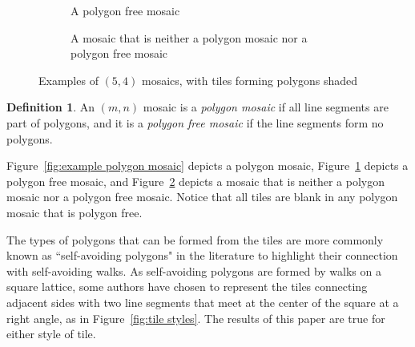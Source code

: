 \documentclass[12pt]{article}
\theoremstyle{plain}
\theoremstyle{remark}
\theoremstyle{definition}
\newtheorem{definition}{Definition}[section]
\theoremstyle{remark}
\theoremstyle{definition}
\newcommand{\cell}[4]{ \draw[thick] ( #1 , #2 ) rectangle ( #3 , #4 );}
\newcommand{\cellA}[4]{ \draw[thick] ( #1 , #2 ) rectangle ( #3 , #4 ); \draw[red, thick, densely dotted] (#3 * 0.5 + #1 * 0.5 , #2) -- (#1, #4 * 0.5 + #2 * 0.5);}
\newcommand{\cellC}[4]{ \draw[thick] ( #1 , #2 ) rectangle ( #3 , #4 ); \draw[red, thick, densely dotted] (#3 * 0.5 + #1 * 0.5 , #4) -- (#3, #4 * 0.5 + #2 * 0.5);}
\newcommand{\cellD}[4]{ \draw[thick] ( #1 , #2 ) rectangle ( #3 , #4 ); \draw[red, thick, densely dotted] (#3 * 0.5 + #1 * 0.5 , #4) -- (#1, #4 * 0.5 + #2 * 0.5);}
\newcommand{\cellE}[4]{ \draw[thick] ( #1 , #2 ) rectangle ( #3 , #4 ); \draw[red, thick, densely dotted] (#3, #4 * 0.5 + #2 * 0.5) -- (#1, #4 * 0.5 + #2 * 0.5);}
\newcommand{\cellF}[4]{ \draw[thick] ( #1 , #2 ) rectangle ( #3 , #4 ); \draw[red, thick, densely dotted] (#3 * 0.5 + #1 * 0.5 , #2) -- (#3 * 0.5 + #1 * 0.5 , #4);}
\newcommand{\cellAf}[4]{\filldraw[gray!80] ( #1 , #2 ) rectangle ( #3 , #4 ); \draw[thick] ( #1 , #2 ) rectangle ( #3 , #4 ); \draw[red, thick, densely dotted] (#3 * 0.5 + #1 * 0.5 , #2) -- (#1, #4 * 0.5 + #2 * 0.5);}
\newcommand{\cellBf}[4]{\filldraw[gray!80] ( #1 , #2 ) rectangle ( #3 , #4 ); \draw[thick] ( #1 , #2 ) rectangle ( #3 , #4 ); \draw[red, thick, densely dotted] (#3 * 0.5 + #1 * 0.5 , #2) -- (#3, #4 * 0.5 + #2 * 0.5);}
\newcommand{\cellCf}[4]{\filldraw[gray!80] ( #1 , #2 ) rectangle ( #3 , #4 ); \draw[thick] ( #1 , #2 ) rectangle ( #3 , #4 ); \draw[red, thick, densely dotted] (#3 * 0.5 + #1 * 0.5 , #4) -- (#3, #4 * 0.5 + #2 * 0.5);}
\newcommand{\cellDf}[4]{\filldraw[gray!80] ( #1 , #2 ) rectangle ( #3 , #4 ); \draw[thick] ( #1 , #2 ) rectangle ( #3 , #4 ); \draw[red, thick, densely dotted] (#3 * 0.5 + #1 * 0.5 , #4) -- (#1, #4 * 0.5 + #2 * 0.5);}
\newcommand{\cellEf}[4]{\filldraw[gray!80] ( #1 , #2 ) rectangle ( #3 , #4 ); \draw[thick] ( #1 , #2 ) rectangle ( #3 , #4 ); \draw[red, thick, densely dotted] (#3, #4 * 0.5 + #2 * 0.5) -- (#1, #4 * 0.5 + #2 * 0.5);}
\newcommand{\cellFf}[4]{\filldraw[gray!80] ( #1 , #2 ) rectangle ( #3 , #4 ); \draw[thick] ( #1 , #2 ) rectangle ( #3 , #4 ); \draw[red, thick, densely dotted] (#3 * 0.5 + #1 * 0.5 , #2) -- (#3 * 0.5 + #1 * 0.5 , #4);}
\begin{document}
\begin{figure}[h!]
\begin{center}
\begin{subfigure}[t]{0.29\textwidth}
\begin{center}
\begin{tikzpicture}
    \end{tikzpicture}
    \end{center}
\caption{A polygon free mosaic}
\label{fig:example polygon free mosaic}
\end{subfigure}
\hspace{0.05cm}
\begin{subfigure}[t]{0.29\textwidth}
    \begin{center}

    \end{center}
    \caption{A mosaic that is neither a polygon mosaic nor a polygon free mosaic}
    \label{fig:example not polygon free mosaic}
\end{subfigure}
\end{center}
\caption{Examples of $(5,4)$ mosaics, with tiles forming polygons shaded}
\label{fig:example mosaics}
\end{figure}

\begin{definition}
An $(m,n)$ mosaic is a \textit{polygon mosaic} if all line segments are part of polygons, and it is a \textit{polygon free mosaic} if the line segments form no polygons.
\end{definition}

Figure~\ref{fig:example polygon mosaic} depicts a polygon mosaic, Figure~\ref{fig:example polygon free mosaic} depicts a polygon free mosaic, and Figure~\ref{fig:example not polygon free mosaic} depicts a mosaic that is neither a polygon mosaic nor a polygon free mosaic. Notice that all tiles are blank in any polygon mosaic that is polygon free.

The types of polygons that can be formed from the tiles are more commonly known as ``self-avoiding polygons" in the literature \cite{flory1949configuration, guttmann} to highlight their connection with self-avoiding walks. As self-avoiding polygons are formed by walks on a square lattice, some authors \cite{Hong2018} have chosen to represent the tiles connecting adjacent sides with two line segments that meet at the center of the square at a right angle, as in Figure~\ref{fig:tile styles}. The results of this paper are true for either style of tile.
\end{document}
